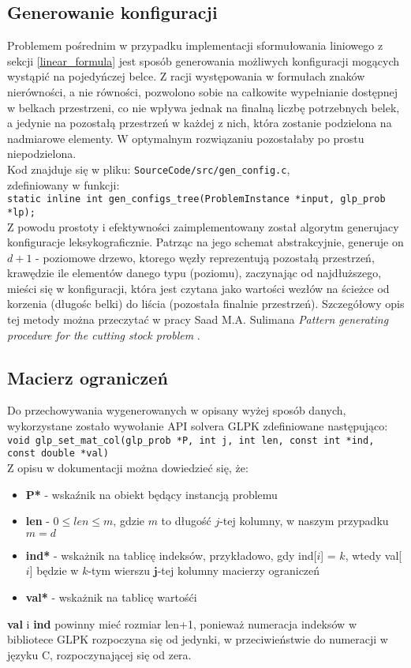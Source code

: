 \subsection{Generowanie konfiguracji}
Problemem pośrednim w przypadku implementacji sformułowania liniowego z sekcji \ref{linear_formula} jest sposób generowania możliwych konfiguracji mogących wystąpić na pojedyńczej belce.
Z racji występowania w formułach znaków nierówności, a nie równości, pozwolono sobie na całkowite wypełnianie dostępnej w belkach przestrzeni, co nie wpływa jednak na finalną liczbę potrzebnych belek, a jedynie na pozostałą przestrzeń w każdej z nich, która zostanie podzielona na nadmiarowe elementy. W optymalnym rozwiązaniu pozostałaby po prostu niepodzielona.\\
Kod znajduje się w pliku: \verb|SourceCode/src/gen_config.c|,  \\ zdefiniowany w funkcji: \\ \verb|static inline int gen_configs_tree(ProblemInstance *input, glp_prob *lp);| \\
Z powodu prostoty i efektywności zaimplementowany został algorytm generujacy konfiguracje leksykograficznie. Patrząc na jego schemat abstrakcyjnie, generuje on $d + 1$ - poziomowe drzewo, ktorego węzły reprezentują pozostałą przestrzeń, krawędzie ile elementów danego typu (poziomu), zaczynając od najdłuższego, mieści się w konfiguracji, która jest czytana jako wartości wezłów na ścieżce od korzenia (długośc belki) do liścia (pozostała finalnie przestrzeń).
Szczegółowy opis tej metody można przeczytać w pracy Saad M.A. Sulimana \textit{Pattern generating procedure for the cutting stock problem} \cite{GEN_CONFIGS}. \\

\subsection{Macierz ograniczeń} \label{macierz_ograniczen}
Do przechowywania wygenerowanych w opisany wyżej sposób danych, wykorzystane zostało wywołanie API solvera GLPK zdefiniowane następująco: \\
\verb|void glp_set_mat_col(glp_prob *P, int j, int len, const int *ind, const double *val)| \\
Z opisu w dokumentacji \cite{GLPK_DOCS} można dowiedzieć się, że:
\begin{itemize}
	\item \textbf{P*} - wskaźnik na obiekt będący instancją problemu
	\item \textbf{len} - $0 \leq len \leq m$, gdzie $m$ to długość $j$-tej kolumny, w naszym przypadku $m = d$
	\item \textbf{ind*} - wskażnik na tablicę indeksów, przykładowo, gdy ind[$i$] = $k$, wtedy val[$i$] będzie w $k$-tym wierszu $\mathbf{j}$-tej kolumny macierzy ograniczeń
	\item \textbf{val*} - wskażnik na tablicę wartośći
\end{itemize}
\textbf{val} i \textbf{ind} powinny mieć rozmiar len+1, ponieważ numeracja indeksów w bibliotece GLPK rozpoczyna się od jedynki, w przeciwieństwie do numeracji w języku C, rozpoczynającej się od zera. \\

